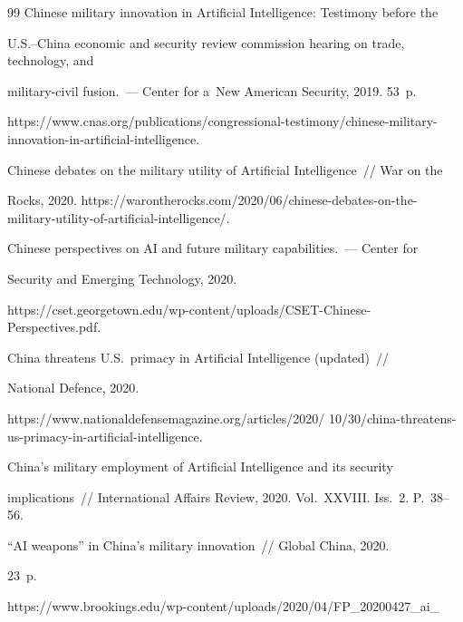 {{\begin{thebibliography}{99}
 Chinese military innovation in Artificial Intelligence: Testimony before the 


U.S.--China economic and security review commission hearing on trade, technology, and 


military-civil fusion.~--- Center for a~New American Security, 2019. 53~p.


{\sf https://www.cnas.org/publications/congressional-testimony/chinese-military-innovation-in-artificial-intelligence}.




 Chinese debates on the military utility of Artificial Intelligence~/\!\!/ War on the 


Rocks, 2020. {\sf https://warontherocks.com/2020/06/chinese-debates-on-the-military-utility-of-artificial-intelligence/}.







 Chinese perspectives on AI and future military capabilities.~--- Center for 


Security and Emerging Technology, 2020.


{\sf https://cset.georgetown.edu/wp-content/uploads/CSET-Chinese-Perspectives.pdf}.







 China threatens U.S.\ primacy in Artificial Intelligence (updated)~/\!\!/ 


National Defence, 2020.


{\sf https://www.nationaldefensemagazine.org/articles/2020/ 10/30/china-threatens-us-primacy-in-artificial-intelligence}.







 China's military employment of Artificial Intelligence and its security 


implications~/\!\!/ International Affairs Review, 2020. Vol.~XXVIII. Iss.~2. P.~38--56.




 ``AI weapons'' in China's military innovation~/\!\!/ Global China, 2020. 


23~p. {\sf https://www.brookings.edu/wp-content/uploads/2020/04/FP\_20200427\_ai\_


}
\end{thebibliography}}}
